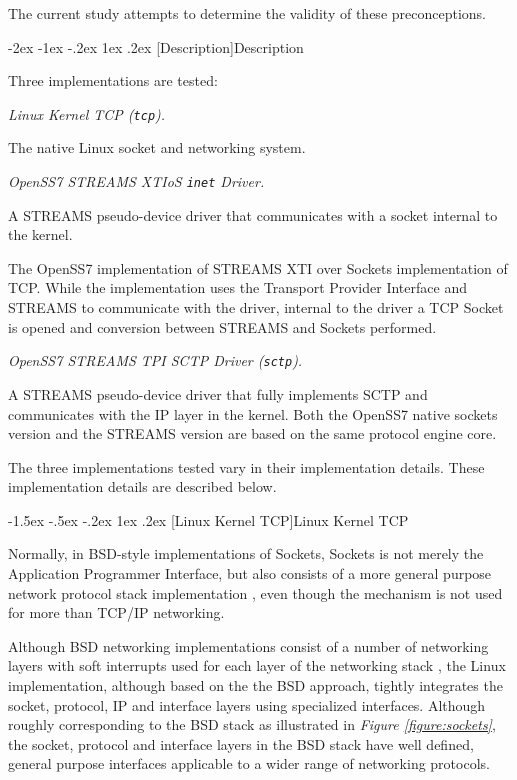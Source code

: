 \documentclass[letterpaper,final,notitlepage,twocolumn,10pt,twoside]{article}
\makeatletter
\renewcommand\section{\@startsection {section}{1}{\z@}%
                                   {-2ex \@plus -1ex \@minus -.2ex}%
                                   {1ex \@plus .2ex}%
                                   {\normalfont\large\bfseries}}
\renewcommand\subsection{\@startsection{subsection}{2}{\z@}%
                                     {-1.5ex \@plus -.5ex \@minus -.2ex}%
                                     {1ex \@plus .2ex}%
                                     {\normalfont\normalsize\bfseries}}
\makeatother
\begin{document}
The current study attempts to determine the validity of these preconceptions.

\section[Description]{Description}

Three implementations are tested:

\begin{description}

\item {\it Linux Kernel TCP ({\tt tcp}).}

The native Linux socket and networking system.

\item {\it OpenSS7 STREAMS XTIoS {\tt inet} Driver.}

A STREAMS pseudo-device driver that communicates with a socket internal to the kernel.

The OpenSS7 implementation of STREAMS XTI over Sockets implementation of TCP.  While the
implementation uses the Transport Provider Interface and STREAMS to communicate with the driver,
internal to the driver a TCP Socket is opened and conversion between STREAMS and Sockets performed.

\item {\it OpenSS7 STREAMS TPI SCTP Driver ({\tt sctp}).}

A STREAMS pseudo-device driver that fully implements SCTP and communicates with the IP layer in the
kernel.  Both the OpenSS7 native sockets version and the STREAMS version are based on the same
protocol engine core.

\end{description}

The three implementations tested vary in their implementation details.  These implementation details
are described below.

\subsection[Linux Kernel TCP]{Linux Kernel TCP}
\label{section:lktcp}

Normally, in BSD-style implementations of Sockets, Sockets is not merely the Application Programmer
Interface, but also consists of a more general purpose network protocol stack implementation
\cite[]{bsd}, even though the mechanism is not used for more than TCP/IP networking.  \cite[]{magic}

Although BSD networking implementations consist of a number of networking layers with soft
interrupts used for each layer of the networking stack \cite[]{bsd}, the Linux implementation,
although based on the the BSD approach, tightly integrates the socket, protocol, IP and interface
layers using specialized interfaces.  Although roughly corresponding to the BSD stack as illustrated
in \textit{Figure \ref{figure:sockets}}, the socket, protocol and interface layers in the BSD stack
have well defined, general purpose interfaces applicable to a wider range of networking protocols.
\end{document}
